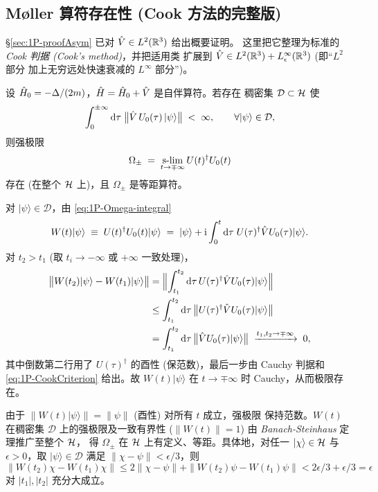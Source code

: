 \subsection{Møller 算符存在性 (Cook 方法的完整版)}
\label{ssec:1P-CookProof}

\S\ref{sec:1P-proofAsym} 已对 $\hat{V}\in L^2(\mathbb{R}^3)$ 给出概要证明。
这里把它整理为标准的 \emph{Cook 判据 (Cook's method)}，并把适用类
扩展到 $\hat{V}\in L^2(\mathbb{R}^3) + L^\infty_\epsilon(\mathbb{R}^3)$ (即“$L^2$ 部分
加上无穷远处快速衰减的 $L^\infty$ 部分”)。

\begin{theorem}[Cook]
\label{thm:1P-Cook}
设 $\hat{H}_0=-\Delta/(2m)$，$\hat{H}=\hat{H}_0+\hat{V}$ 是自伴算符。若存在
稠密集 $\mathcal{D}\subset \mathcal{H}$ 使
\begin{equation}
  \int_{0}^{\pm\infty}\mathrm{d}\tau\;
  \bigl\|\hat{V}\,U_0(\tau)\,|\psi\rangle\bigr\|
  \;<\;\infty,\qquad \forall |\psi\rangle\in\mathcal{D},
  \label{eq:1P-CookCriterion}
\end{equation}
则强极限
\begin{equation}
  \Omega_\pm \;=\; \operatorname*{s\text{-}lim}_{t\to\mp\infty} U(t)^{\dagger}U_0(t)
  \label{eq:1P-Omega-slim}
\end{equation}
存在 (在整个 $\mathcal{H}$ 上)，且 $\Omega_\pm$ 是等距算符。
\end{theorem}

\begin{proof*}
对 $|\psi\rangle\in\mathcal{D}$，由 \eqref{eq:1P-Omega-integral}
\[
  W(t)|\psi\rangle\;\equiv\;U(t)^\dagger U_0(t)|\psi\rangle
  \;=\;|\psi\rangle + \mathrm{i}\int_0^{t}\mathrm{d}\tau\;U(\tau)^\dagger\hat{V} U_0(\tau)|\psi\rangle.
\]
对 $t_2>t_1$ (取 $t_i\to-\infty$ 或 $+\infty$ 一致处理)，
\begin{align*}
  \bigl\|W(t_2)|\psi\rangle - W(t_1)|\psi\rangle\bigr\|
  &= \Bigl\|\int_{t_1}^{t_2}\mathrm{d}\tau\,U(\tau)^\dagger\hat{V} U_0(\tau)|\psi\rangle\Bigr\|\\
  &\le \int_{t_1}^{t_2}\mathrm{d}\tau\,\bigl\|U(\tau)^\dagger\hat{V} U_0(\tau)|\psi\rangle\bigr\|\\
  &= \int_{t_1}^{t_2}\mathrm{d}\tau\,\bigl\|\hat{V} U_0(\tau)|\psi\rangle\bigr\|
  \;\xrightarrow{t_1,t_2\to\mp\infty}\;0,
\end{align*}
其中倒数第二行用了 $U(\tau)^\dagger$ 的酉性 (保范数)，最后一步由
Cauchy 判据和 \eqref{eq:1P-CookCriterion} 给出。故 $W(t)|\psi\rangle$
在 $t\to\mp\infty$ 时 Cauchy，从而极限存在。

由于 $\|W(t)|\psi\rangle\|=\|\psi\|$ (酉性) 对所有 $t$ 成立，强极限
保持范数。$W(t)$ 在稠密集 $\mathcal{D}$ 上的强极限及一致有界性
($\|W(t)\|=1$) 由 \emph{Banach-Steinhaus} 定理推广至整个 $\mathcal{H}$，
得 $\Omega_\pm$ 在 $\mathcal{H}$ 上有定义、等距。具体地，对任一
$|\chi\rangle\in\mathcal{H}$ 与 $\epsilon>0$，取 $|\psi\rangle\in\mathcal{D}$
满足 $\|\chi-\psi\|<\epsilon/3$，则
\[
  \|W(t_2)\chi - W(t_1)\chi\|
  \le 2\|\chi-\psi\| + \|W(t_2)\psi-W(t_1)\psi\|
  < 2\epsilon/3 + \epsilon/3 = \epsilon
\]
对 $|t_1|,|t_2|$ 充分大成立。
\end{proof*}

